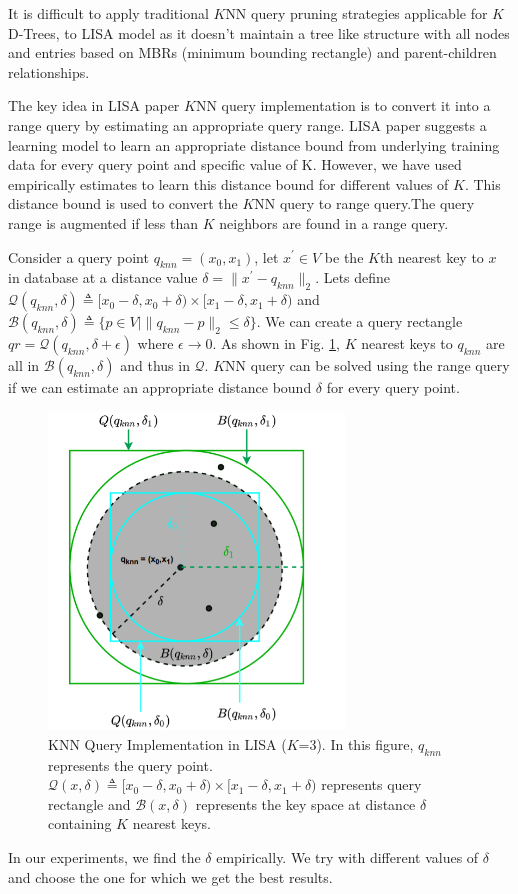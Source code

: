 It is difficult to apply traditional $K$NN query pruning strategies applicable for $K$D-Trees, to LISA model as it doesn't maintain a tree like structure with all nodes and entries based on MBRs (minimum bounding rectangle) and parent-children relationships. 

The key idea in LISA paper $K$NN query implementation is to convert it into a range query by estimating an appropriate query range. LISA paper suggests a learning model to learn an appropriate distance bound from underlying training data for every query point and specific value of K. However, we have used empirically estimates to learn this distance bound for different values of $K$. This distance bound is used to convert the $K$NN query to range query.The query range is augmented if less than $K$ neighbors are found in a range query. 

Consider a query point $q_{knn}=(x_{0},x_{1})$, let $x^{'} \in V$ be the $K$th nearest key to $x$ in database at a distance value $\delta = \| x^{'}-q_{knn}\|_{2} $. Lets define $ \mathcal{Q}(q_{knn},\delta) \triangleq [x_{0}-\delta, x_{0}+\delta) \times[x_{1}-\delta, x_{1}+\delta)$ and $\mathcal{B}(q_{knn}, \delta)  \triangleq \{p \in V \mid \| q_{knn}-p\|_{2} \leq \delta \} $. We can create a query rectangle $qr =  \mathcal{Q}(q_{knn}, \delta + \epsilon)$ where $\epsilon \rightarrow 0$. As shown in Fig. \ref{fig:KNN_Query_LISA}, $K$ nearest keys to $q_{knn}$ are all in $\mathcal{B}(q_{knn}, \delta)$ and thus in $\mathcal{Q}$. $K$NN query can be solved using the range query if we can estimate an appropriate distance bound $\delta$ for every query point.

\begin{figure}[t]
    \centering
    \includegraphics[width=0.7\textwidth]{graphs/KNN_Query_LISA.png}
    \caption{KNN Query Implementation in LISA ($K$=3). In this figure, $q_{knn}$ represents the query point. $\mathcal{Q}(x,\delta) \triangleq [x_{0}-\delta, x_{0}+\delta)\times[x_{1}-\delta, x_{1}+\delta)$ represents query rectangle and $ \mathcal{B}(x, \delta)$ represents the key space at distance $\delta$ containing $K$ nearest keys.
    }
    \label{fig:KNN_Query_LISA}
\end{figure}
In our experiments, we find the $\delta$ empirically. We try with different values of $\delta$ and choose the one for which we get the best results.